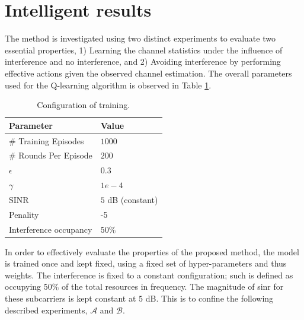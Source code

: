 \section{Intelligent results}\label{sec:RL_results}
The method is investigated using two distinct experiments to evaluate two essential properties, 1) Learning the channel statistics under the influence of interference and no interference, and 2) Avoiding interference by performing effective actions given the observed channel estimation. The overall parameters used for the Q-learning algorithm is observed in Table \ref{tab:q_learning_param}.

\begin{table}
\centering
\begin{tabular}{l|l}
\toprule
\textbf{Parameter}                 & \textbf{Value} \\ \midrule
\# Training Episodes & $1000$ \\
\# Rounds Per Episode & $200$ \\
$\epsilon$ & $0.3$\\
$\gamma$ & $1e-4$ \\
SINR & $5$ dB (constant) \\
Penality & -5 \\
Interference occupancy & $50\%$
\end{tabular}
\vspace{1em}
\caption{Configuration of training.}\label{tab:q_learning_param}
\end{table}

In order to effectively evaluate the properties of the proposed method, the model is trained once and kept fixed, using a fixed set of hyper-parameters and thus weights. The interference is fixed to a constant configuration; such is defined as occupying $50\%$ of the total resources in frequency. The magnitude of \gls{sinr} for these subcarriers is kept constant at $5$ dB. This is to confine the following described experiments, $\mathcal{A}$ and $\mathcal{B}$. 

